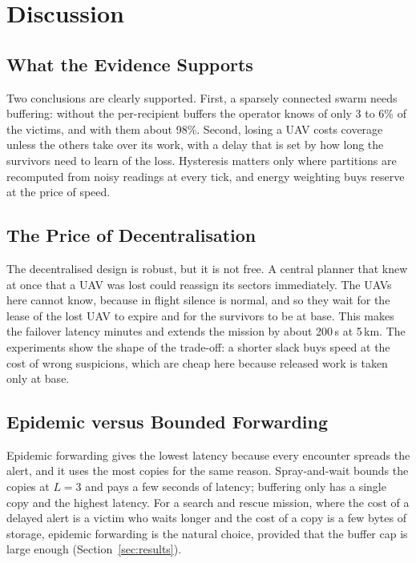 \documentclass[10pt,letterpaper]{article}
\begin{document}
\section{Discussion}\label{sec:disc}
\subsection{What the Evidence Supports}
Two conclusions are clearly supported. First, a sparsely connected swarm needs buffering: without the per-recipient buffers the operator knows of only 3 to 6\% of the victims, and with them about 98\%. Second, losing a UAV costs coverage unless the others take over its work, with a delay that is set by how long the survivors need to learn of the loss. Hysteresis matters only where partitions are recomputed from noisy readings at every tick, and energy weighting buys reserve at the price of speed.

\subsection{The Price of Decentralisation}
The decentralised design is robust, but it is not free. A central planner that knew at once that a UAV was lost could reassign its sectors immediately. The UAVs here cannot know, because in flight silence is normal, and so they wait for the lease of the lost UAV to expire and for the survivors to be at base. This makes the failover latency minutes and extends the mission by about 200\,s at 5\,km. The experiments show the shape of the trade-off: a shorter slack buys speed at the cost of wrong suspicions, which are cheap here because released work is taken only at base.

\subsection{Epidemic versus Bounded Forwarding}
Epidemic forwarding gives the lowest latency because every encounter spreads the alert, and it uses the most copies for the same reason. Spray-and-wait bounds the copies at $L=3$ and pays a few seconds of latency; buffering only has a single copy and the highest latency. For a search and rescue mission, where the cost of a delayed alert is a victim who waits longer and the cost of a copy is a few bytes of storage, epidemic forwarding is the natural choice, provided that the buffer cap is large enough (Section~\ref{sec:results}).
\end{document}
